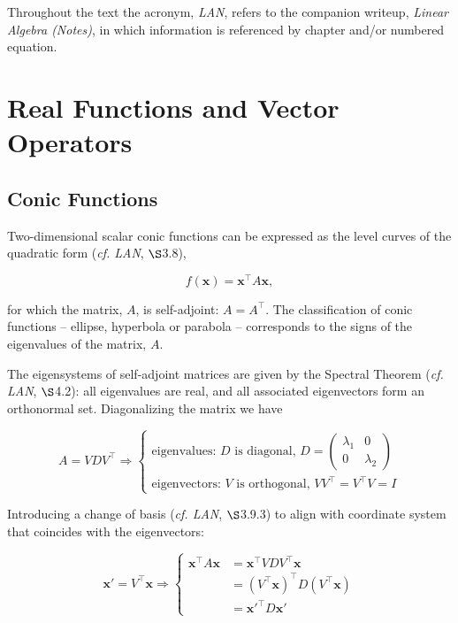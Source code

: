 \documentclass[12pt, twoside, draft]{article}
\begin{document}
Throughout the text the acronym, \textit{LAN}, refers to the companion writeup, \textit{Linear Algebra (Notes)}, in which information is referenced by chapter and/or numbered equation.

\section{Real Functions and Vector Operators}\label{sec:real_functions}

\subsection{Conic Functions}

Two-dimensional scalar conic functions can be expressed as the level curves of the quadratic form (\textit{cf. LAN}, $\S$3.8),

\begin{equation}\label{eq:conic_section}
f(\mathbf{x}) = \mathbf{x}^\top A \mathbf{x}, 
\end{equation}

for which the matrix, $A$, is self-adjoint: $A = A^\top$.  The classification of conic functions -- ellipse, hyperbola or parabola -- corresponds to the signs of the eigenvalues of the matrix, $A$.

 The eigensystems of self-adjoint matrices are given by the Spectral Theorem (\textit{cf. LAN}, $\S$4.2): all eigenvalues are real, and all associated eigenvectors form an orthonormal set.  Diagonalizing the matrix we have

\begin{equation}
A = VDV^\top \Rightarrow \begin{cases} \text{eigenvalues: } D \text{ is diagonal, } D =\begin{pmatrix} \lambda_1 & 0 \\ 0 & \lambda_2 \end{pmatrix} \\
\text{eigenvectors: } V  \text{ is orthogonal, } VV^\top = V^\top V = I \end{cases}
\end{equation}

Introducing a change of basis (\textit{cf. LAN}, $\S$3.9.3) to align with coordinate system that coincides with the eigenvectors: 

\begin{equation}
\mathbf{x}' = V^\top \mathbf{x} \Rightarrow \begin{cases} \mathbf{x}^\top A \mathbf{x} &= \mathbf{x}^\top VDV^\top \mathbf{x} \\
&= \left(V^\top \mathbf{x} \right)^\top D \left(V^\top \mathbf{x} \right) \\ &= \mathbf{x}'^\top D \mathbf{x}' \end{cases}
\end{equation}
\end{document}
